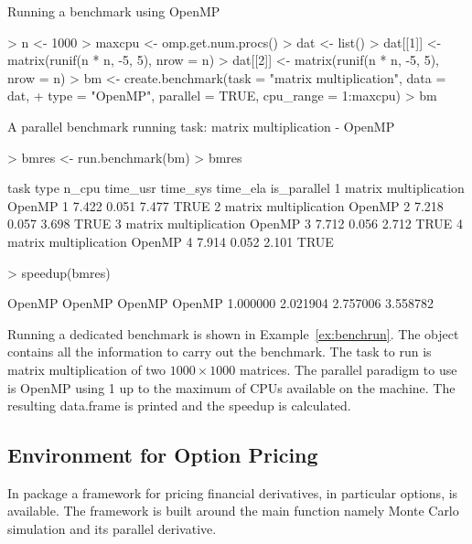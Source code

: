 \begin{Example} Running a benchmark using OpenMP
\label{ex:benchrun}
\begin{Schunk}
\begin{Sinput}
> n <- 1000
> maxcpu <- omp.get.num.procs()
> dat <- list()
> dat[[1]] <- matrix(runif(n * n, -5, 5), nrow = n)
> dat[[2]] <- matrix(runif(n * n, -5, 5), nrow = n)
> bm <- create.benchmark(task = "matrix multiplication", data = dat, 
+     type = "OpenMP", parallel = TRUE, cpu_range = 1:maxcpu)
> bm
\end{Sinput}
\begin{Soutput}
A parallel benchmark running task: matrix multiplication - OpenMP
\end{Soutput}
\begin{Sinput}
> bmres <- run.benchmark(bm)
> bmres
\end{Sinput}
\begin{Soutput}
                   task   type n_cpu time_usr time_sys time_ela is_parallel
1 matrix multiplication OpenMP     1    7.422    0.051    7.477        TRUE
2 matrix multiplication OpenMP     2    7.218    0.057    3.698        TRUE
3 matrix multiplication OpenMP     3    7.712    0.056    2.712        TRUE
4 matrix multiplication OpenMP     4    7.914    0.052    2.101        TRUE
\end{Soutput}
\begin{Sinput}
> speedup(bmres)
\end{Sinput}
\begin{Soutput}
  OpenMP   OpenMP   OpenMP   OpenMP 
1.000000 2.021904 2.757006 3.558782 
\end{Soutput}
\end{Schunk}
\end{Example}

Running a dedicated benchmark is shown in
Example~\ref{ex:benchrun}. The object  contains all the
information to carry out the benchmark. The task to run is matrix
multiplication of two $1000 \times 1000$ matrices. The parallel
paradigm to use is OpenMP using 1 up to the maximum of CPUs available
on the machine. The resulting data.frame is printed and the speedup is
calculated.

\subsection{Environment for Option Pricing}

In package  a framework for pricing financial derivatives,
in particular options, is available. The framework is built around the
main function namely Monte Carlo simulation and its parallel
derivative. 

